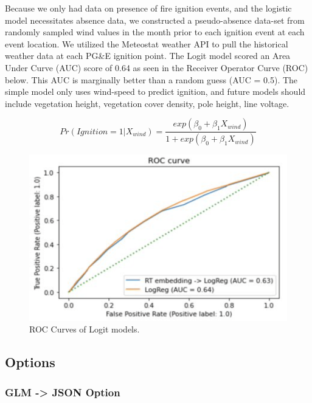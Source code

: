 \documentclass{article}
\begin{document}
Because we only had data on presence of fire ignition events, and the logistic model necessitates absence data, we constructed a pseudo-absence data-set from randomly sampled wind values in the month prior to each ignition event at each event location. We utilized the Meteostat weather API to pull the historical weather data at each PG&E ignition point.  The Logit model scored an Area Under Curve (AUC) score of 0.64 as seen in the Receiver Operator Curve (ROC) below. This AUC is marginally better than a random guess (AUC = 0.5). The simple model only uses wind-speed to predict ignition, and future models should include vegetation height, vegetation cover density, pole height, line voltage.


\begin{equation}
    Pr(Ignition=1| X_{wind}) = {\frac{exp(\beta_0 + \beta_1X_{wind})}{1 + exp (\beta_0 + \beta_1X_{wind} )}}
\end{equation}


\begin{figure}[H]
    \centering
    \begin{minipage}{0.55\textwidth}
        \centering
        \includegraphics[width=1\textwidth]{ROC Curve.png}
        \caption{ROC Curves of Logit models.}
    \end{minipage}
\end{figure}

\subsection{Options}

\subsubsection{GLM -> JSON Option}
\end{document}
